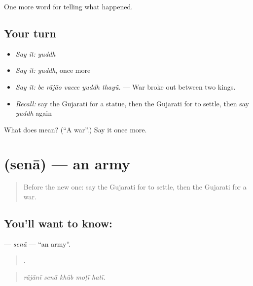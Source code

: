 \begin{grammarlens}[title={What you've built}]
One more word for telling what happened.
\end{grammarlens}

\subsection*{Your turn}
\begin{itemize}
\raggedright
  \item \emph{Say it:} \emph{yuddh}
  \item \emph{Say it:} \emph{yuddh}, once more
  \item \emph{Say it:} \emph{be rājāo vacce yuddh thayũ.} — War broke out between two kings.
  \item \emph{Recall:} say the Gujarati for a statue, then the Gujarati for to settle, then say \emph{yuddh} again
\end{itemize}

\begin{tcolorbox}[breakable,colback=teal!4,colframe=teal!35!black,title={Before you move on}]
What does  mean? (\textquotedblleft{}A war\textquotedblright{}.) Say it once more.
\end{tcolorbox}
\section[\texorpdfstring{\gu{સેના} (senā)}{સેના (senā)}]{ (senā) — an army}

\label{lesson:GU-C320-sena}



\begin{quote}
Before the new one: say the Gujarati for to settle, then the Gujarati for a war.
\end{quote}

\subsection*{You'll want to know: }
\textbf{} — \emph{senā} — \textquotedblleft{}an army\textquotedblright{}.

\begin{quote}
    .
\end{quote}

\begin{quote}
\emph{rājānī senā khūb moṭī hatī.}
\end{quote}

